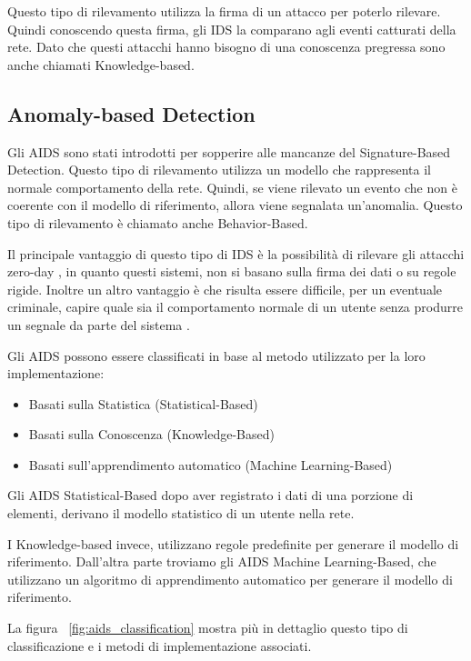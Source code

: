 Questo tipo di rilevamento utilizza la firma di un attacco per poterlo rilevare. Quindi conoscendo questa firma, gli IDS la comparano agli eventi catturati della rete. Dato che questi attacchi hanno bisogno di una conoscenza pregressa sono anche chiamati Knowledge-based.


\subsection{Anomaly-based Detection}

Gli AIDS sono stati introdotti per sopperire alle mancanze del Signature-Based Detection.
Questo tipo di rilevamento utilizza un modello che rappresenta il normale comportamento della rete. Quindi, se viene rilevato un evento che non è coerente con il modello di riferimento, allora viene segnalata un'anomalia. Questo tipo di rilevamento è chiamato anche Behavior-Based.


Il principale vantaggio di questo tipo di IDS è la possibilità di rilevare gli attacchi zero-day \cite{UnsupervisedAlgorithmsDetect2021}, in quanto questi sistemi, non si basano sulla firma dei dati o su regole rigide. Inoltre un altro vantaggio è che risulta essere difficile, per un eventuale criminale, capire quale sia il comportamento normale di un utente senza produrre un segnale da parte del sistema \cite{SurveyIntrusionDetection2019}.


\cite{SurveyIntrusionDetection2019} Gli AIDS possono essere classificati in base al metodo utilizzato per la loro implementazione:

\begin{itemize}
    \item Basati sulla Statistica (Statistical-Based)
    \item Basati sulla Conoscenza (Knowledge-Based)
    \item Basati sull'apprendimento automatico (Machine Learning-Based)
\end{itemize}


Gli AIDS Statistical-Based dopo aver registrato i dati di una porzione di elementi, derivano il modello statistico di un utente nella rete. 


I Knowledge-based invece, utilizzano regole predefinite per generare il modello di riferimento.
Dall'altra parte troviamo gli AIDS Machine Learning-Based, che utilizzano un algoritmo di apprendimento automatico per generare il modello di riferimento. 

La figura ~\ref{fig:aids_classification} mostra più in dettaglio questo tipo di classificazione e i metodi di implementazione associati.

